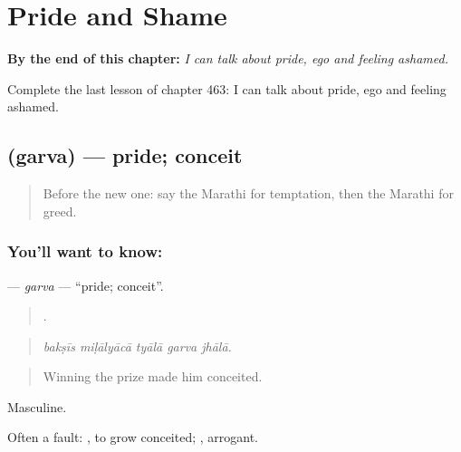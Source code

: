 
\chapter{Pride and Shame}
\label{ch:mr-pride-and-shame}

\begin{chapteropening}
\textbf{By the end of this chapter:} \emph{I can talk about pride, ego and feeling ashamed.}

Complete the last lesson of chapter 463: I can talk about pride, ego and feeling ashamed.
\end{chapteropening}

\section[\texorpdfstring{\mr{गर्व} (garva)}{गर्व (garva)}]{ (garva) — pride; conceit}

\label{lesson:MR-C463-garva}



\begin{quote}
Before the new one: say the Marathi for temptation, then the Marathi for greed.
\end{quote}

\subsection*{You'll want to know: }
\textbf{} — \emph{garva} — \textquotedblleft{}pride; conceit\textquotedblright{}.

\begin{quote}
    .
\end{quote}

\begin{quote}
\emph{bakṣīs miḷālyācā tyālā garva jhālā.}
\end{quote}

\begin{quote}
Winning the prize made him conceited.
\end{quote}

Masculine.

Often a fault:  , to grow conceited; , arrogant.

